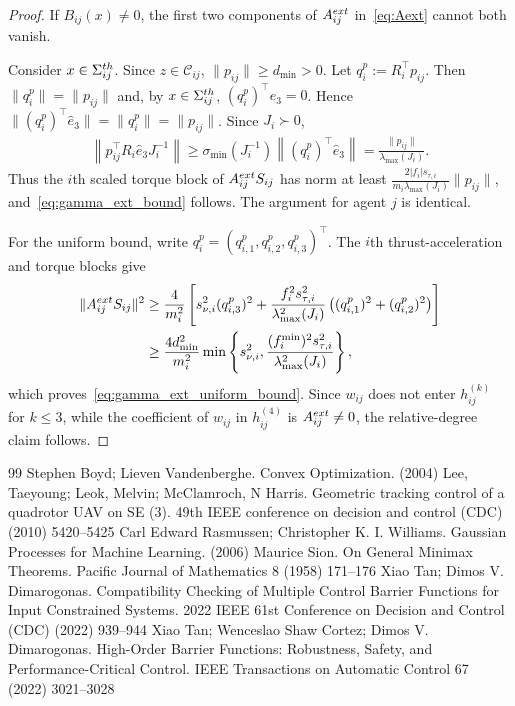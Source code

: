 \documentclass[10pt,a4paper]{amsart}
\begin{document}
\begin{proof}
If $B_{ij}(x)\neq0$, the first two components of
$A_{ij}^{\rm ext}$ in~\eqref{eq:Aext} cannot both vanish.

Consider $x\in\Sigma_{ij}^{\rm th}$. Since $z\in\mathcal C_{ij}$,
$\|p_{ij}\|\ge d_{\min}>0$.
Let $q_i^p:=R_i^\top p_{ij}$. Then
$\|q_i^p\|=\|p_{ij}\|$ and, by
$x\in\Sigma_{ij}^{\rm th}$,
$(q_i^p)^\top e_3=0$. Hence
$\|(q_i^p)^\top\widehat e_3\|
    =
    \|q_i^p\|
    =
    \|p_{ij}\|$. Since $J_i\succ0$,
\[
\begin{aligned}
\left\|
p_{ij}^\top R_i\widehat e_3J_i^{-1}
\right\|
\ge
\sigma_{\min}(J_i^{-1})
\left\|
(q_i^p)^\top\widehat e_3
\right\| =
\frac{\|p_{ij}\|}{\lambda_{\max}(J_i)}.
\end{aligned}
\]
Thus the $i$th scaled torque block of
$A_{ij}^{\rm ext}S_{ij}$ has norm at least
$\frac{2|f_i|s_{\tau,i}}{m_i\lambda_{\max}(J_i)}
\|p_{ij}\|$, and~\eqref{eq:gamma_ext_bound} follows.
The argument for agent $j$ is identical. 

For the uniform bound, write
$q_i^p=(q_{i,1}^p,q_{i,2}^p,q_{i,3}^p)^\top$.
The $i$th thrust-acceleration and torque blocks give
\[
\begin{aligned}
\|A_{ij}^{\rm ext}S_{ij}\|^2
&\ge
\frac{4}{m_i^2}
\left[
s_{\nu,i}^2(q_{i,3}^p)^2
+
\frac{f_i^2s_{\tau,i}^2}
{\lambda_{\max}^2(J_i)}
\left((q_{i,1}^p)^2+(q_{i,2}^p)^2\right)
\right] \\
&\ge
\frac{4d_{\min}^2}{m_i^2}
\min\left\{
s_{\nu,i}^2,
\frac{(f_i^{\min})^2s_{\tau,i}^2}
{\lambda_{\max}^2(J_i)}
\right\},
\end{aligned}
\]
which proves~\eqref{eq:gamma_ext_uniform_bound}. Since $w_{ij}$
does not enter $h_{ij}^{(k)}$
for $k\le 3$, while the coefficient of $w_{ij}$
in $h_{ij}^{(4)}$
is $A_{ij}^{\rm ext}\neq 0$, the relative-degree claim follows.
\end{proof}

\begin{thebibliography}{99}
 Stephen Boyd; Lieven Vandenberghe. Convex Optimization. (2004)
 Lee, Taeyoung; Leok, Melvin; McClamroch, N Harris. Geometric tracking control of a quadrotor UAV on SE (3). 49th IEEE conference on decision and control (CDC) (2010) 5420--5425
 Carl Edward Rasmussen; Christopher K. I. Williams. Gaussian Processes for Machine Learning. (2006)
 Maurice Sion. On General Minimax Theorems. Pacific Journal of Mathematics 8 (1958) 171--176
 Xiao Tan; Dimos V. Dimarogonas. Compatibility Checking of Multiple Control Barrier Functions for Input Constrained Systems. 2022 IEEE 61st Conference on Decision and Control (CDC) (2022) 939--944
 Xiao Tan; Wenceslao Shaw Cortez; Dimos V. Dimarogonas. High-Order Barrier Functions: Robustness, Safety, and Performance-Critical Control. IEEE Transactions on Automatic Control 67 (2022) 3021--3028
\end{thebibliography}
\end{document}
